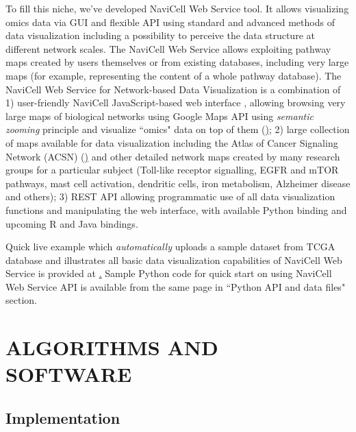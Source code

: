 \documentclass[a4,center,fleqn]{NAR}
\begin{document}
To fill this niche, we've developed NaviCell Web Service tool. It allows visualizing omics data via GUI and flexible API using standard and advanced methods of data visualization including a possibility to perceive the data structure at different network scales. The NaviCell Web Service allows exploiting pathway maps created by users themselves or from existing databases, including very large maps (for example, representing the content of a whole pathway database). The NaviCell Web Service for Network-based Data Visualization is a combination of 1) user-friendly NaviCell JavaScript-based web interface \cite{kuperstein2013navicell}, allowing browsing very large maps of biological networks using Google Maps API using \emph{semantic zooming} principle and visualize ``omics" data on top of them (\href{http://navicell.curie.fr}); 2) large collection of maps available for data visualization including the Atlas of Cancer Signaling Network (ACSN) (\href{http://acsn.curie.fr}) and other detailed network maps created by many research groups for a particular subject (Toll-like receptor signalling, EGFR and mTOR pathways, mast cell activation, dendritic cells, iron metabolism, Alzheimer disease and others); 3) REST API allowing programmatic use of all data visualization functions and manipulating the web interface, with available Python binding and upcoming R and Java bindings.

Quick live example which \emph{automatically} uploads a sample dataset from TCGA database and illustrates all basic data visualization capabilities of NaviCell Web Service is provided at \href{http://navicell.curie.fr/pages/nav\_web\_service.html} . Sample Python code for quick start on using NaviCell Web Service API is available from the same page in ``Python API and data files" section.

\section{ALGORITHMS AND SOFTWARE}

\subsection{Implementation}
\end{document}
